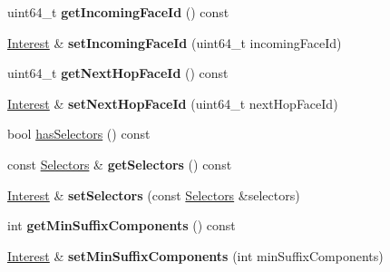 \begin{DoxyCompactItemize}
\item 
uint64\+\_\+t {\bfseries get\+Incoming\+Face\+Id} () const\hypertarget{classndn_1_1Interest_a52cc5152e68693b41e06794483937ff8}{}\label{classndn_1_1Interest_a52cc5152e68693b41e06794483937ff8}

\item 
\hyperlink{classndn_1_1Interest}{Interest} \& {\bfseries set\+Incoming\+Face\+Id} (uint64\+\_\+t incoming\+Face\+Id)\hypertarget{classndn_1_1Interest_ac2ce42eaca6dd45cbf129d6bfd84daa0}{}\label{classndn_1_1Interest_ac2ce42eaca6dd45cbf129d6bfd84daa0}

\item 
uint64\+\_\+t {\bfseries get\+Next\+Hop\+Face\+Id} () const\hypertarget{classndn_1_1Interest_a1ca06a42ab6d0b8d467b827dfe5dd3c1}{}\label{classndn_1_1Interest_a1ca06a42ab6d0b8d467b827dfe5dd3c1}

\item 
\hyperlink{classndn_1_1Interest}{Interest} \& {\bfseries set\+Next\+Hop\+Face\+Id} (uint64\+\_\+t next\+Hop\+Face\+Id)\hypertarget{classndn_1_1Interest_a97a1e1d6eee5c379395ff1c22e1b0928}{}\label{classndn_1_1Interest_a97a1e1d6eee5c379395ff1c22e1b0928}

\item 
bool \hyperlink{classndn_1_1Interest_a8c25a1cb78f1f74779a17b40ac71283c}{has\+Selectors} () const
\item 
const \hyperlink{classndn_1_1Selectors}{Selectors} \& {\bfseries get\+Selectors} () const\hypertarget{classndn_1_1Interest_a43dba7ad9f1e32f97f3d5de187ed9d37}{}\label{classndn_1_1Interest_a43dba7ad9f1e32f97f3d5de187ed9d37}

\item 
\hyperlink{classndn_1_1Interest}{Interest} \& {\bfseries set\+Selectors} (const \hyperlink{classndn_1_1Selectors}{Selectors} \&selectors)\hypertarget{classndn_1_1Interest_a90680dad52e4213abc1b5eeaa5630fbf}{}\label{classndn_1_1Interest_a90680dad52e4213abc1b5eeaa5630fbf}

\item 
int {\bfseries get\+Min\+Suffix\+Components} () const\hypertarget{classndn_1_1Interest_a4aef1153948d2cb2da06a3b6991d3d9f}{}\label{classndn_1_1Interest_a4aef1153948d2cb2da06a3b6991d3d9f}

\item 
\hyperlink{classndn_1_1Interest}{Interest} \& {\bfseries set\+Min\+Suffix\+Components} (int min\+Suffix\+Components)\hypertarget{classndn_1_1Interest_af9328f160622bea8eb5f742d69d1818a}{}\label{classndn_1_1Interest_af9328f160622bea8eb5f742d69d1818a}


\end{DoxyCompactItemize}
